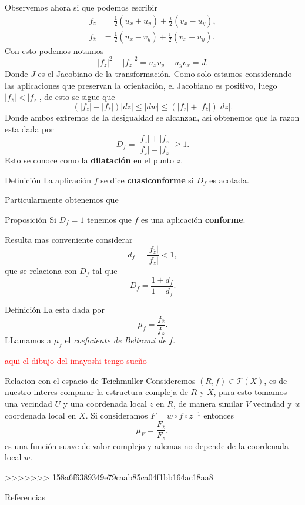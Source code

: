 \documentclass[xcolor=dvipsnames,10pt]{beamer}
\begin{document}
\begin{frame}
    Observemos ahora si que podemos escribir
    \begin{align*}
        f_z&=\frac{1}{2}(u_x+u_y)+\frac{i}{2}(v_x-u_y),\\
        f_{\overline{z}}&=\frac{1}{2}(u_x-v_y)+\frac{i}{2}(v_x+u_y).
    \end{align*}
    Con esto podemos notamos
    $$|f_z|^2-|f_{\overline{z}}|^2=u_xv_y-u_yv_x=J.$$
    Donde $J$ es el Jacobiano de la transformación. Como solo estamos considerando las aplicaciones que preservan la orientación, el Jacobiano es positivo, luego $|f_{\overline{z}}|<|f_z|$, de esto se sigue que
    $$(|f_z|-|f_{\overline{z}}|)|dz|\leq |dw|\leq (|f_z|+|f_{\overline{z}}|)|dz|.$$
    Donde ambos extremos de la desigualdad se alcanzan, asi obtenemos que la razon esta dada por
    $$D_f=\frac{|f_z|+|f_{\overline{z}}|}{|f_z|-|f_{\overline{z}}|}\geq 1.$$
    Esto se conoce como la \textbf{dilatación} en el punto $z$.
\end{frame}

\begin{frame}
    \begin{block}{Definición}
        La aplicación $f$ se dice \textbf{cuasiconforme} si $D_f$ es acotada.
        \end{block}
        Particularmente obtenemos que
\begin{block}{Proposición}
Si $D_f=1$ tenemos que $f$ es una aplicación \textbf{conforme}.
\end{block}
Resulta mas conveniente considerar
    $$d_f=\frac{|f_{\overline{z}}|}{|f_z|}<1,$$
    que se relaciona con $D_f$ tal que
    $$D_f=\frac{1+d_f}{1-d_f}.$$
\end{frame}
\begin{frame}
    \begin{block}{Definición}
        La  esta dada por
        $$\mu_f=\frac{f_{\overline{z}}}{f_z}.$$
        LLamamos a $\mu_f$ el \textit{coeficiente de Beltrami de }$f.$
    \end{block}
    \textcolor{red}{aqui el dibujo del imayoshi tengo sueño}
\end{frame}

\begin{frame}{Relacion con el espacio de Teichmuller}
    Consideremos $(R,f)\in\mathcal{T}(X)$, es de nuestro interes comparar la estructura compleja de $R$ y $X$, para esto tomamos una vecindad $U$ y una coordenada local $z$ en $R$, de manera similar $V$ vecindad y $w$ coordenada local en $X.$ Si consideramos $F=w\circ f\circ z^{-1}$ entonces 
    $$\mu_F=\frac{F_{\overline{z}}}{F_z},$$
    es una función suave de valor complejo y ademas no depende de la coordenada local $w.$
\end{frame}
>>>>>>> 158a6f6389349e79caab85ca04f1bb164ac18aa8
\begin{frame}{Referencias}

\end{frame}
\end{document}
